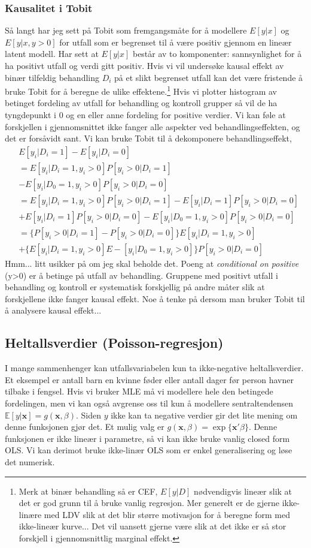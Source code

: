 \subsubsection{Kausalitet i Tobit}
Så langt har jeg sett på Tobit som fremgangsmåte for å modellere $E[y|x]$ og $E[y|x,y>0]$ for utfall som er begrenset til å være positiv gjennom en lineær latent modell. Har sett at $E[y|x]$ består av to komponenter: sannsynlighet for å ha positivt utfall og verdi gitt positiv. Hvis vi vil undersøke kausal effekt av binær tilfeldig behandling $D_i$ på et slikt begrenset utfall kan det være fristende å bruke Tobit for å beregne de ulike effektene.\footnote{Merk at binær behandling så er CEF, $E[y|D]$ nødvendigvis lineær slik at det er god grunn til å bruke vanlig regresjon. Mer generelt er de gjerne ikke-linære med LDV slik at det blir større motivasjon for å beregne form med ikke-lineær kurve... Det vil uansett gjerne være slik at det ikke er så stor forskjell i gjennomsnittlig marginal effekt.} Hvis vi plotter histogram av betinget fordeling av utfall for behandling og kontroll grupper så vil de ha tyngdepunkt i 0 og en eller anne fordeling for positive verdier. Vi kan føle at forskjellen i gjennomsnittet ikke fanger alle aspekter ved behandlingseffekten, og det er forsåvidt sant. Vi kan bruke Tobit til å dekomponere behandlingseffekt,
\begin{align}
&E[y_i|D_i=1] - E[y_i|D_i=0]  \\
&=E[y_i|D_i=1,y_i>0]P[y_i>0|D_i=1] \\
&-E[y_i|D_0=1,y_i>0]P[y_i>0|D_i=0] \\
&= E[y_i|D_i=1,y_i>0]P[y_i>0|D_i=1]-E[y_i|D_i=1]P[y_i>0|D_i=0] \\
&+E[y_i|D_i=1]P[y_i>0|D_i=0]-E[y_i|D_0=1,y_i>0]P[y_i>0|D_i=0] \\
&=\{P[y_i>0|D_i=1]-P[y_i>0|D_i=0]\}E[y_i|D_i=1,y_i>0] \\
&+\{E[y_i|D_i=1,y_i>0]E-[y_i|D_0=1,y_i>0]\}P[y_i>0|D_i=0]
\end{align}
Hmm... litt usikker på om jeg skal beholde det. Poeng at \textit{conditional on positive} (y>0) er å betinge på utfall av behandling. Gruppene med positivt utfall i behandling og kontroll er systematisk forskjellig på andre måter slik at forskjellene ikke fanger kausal effekt. Noe å tenke på dersom man bruker Tobit til å analysere kausal effekt...
\subsection{Heltallsverdier (Poisson-regresjon)}
I mange sammenhenger kan utfallsvariabelen kun ta ikke-negative heltallsverdier. Et eksempel er antall barn en kvinne føder eller antall dager før person havner tilbake i fengsel. Hvis vi bruker MLE må vi modellere hele den betingede fordelingen, men vi kan også avgrense oss til kun å modellere sentraltendensen $\mathbb{E}[y|\mathbf{x}] = g(\mathbf{x},\beta)$. Siden $y$ ikke kan ta negative verdier gir det lite mening om denne funksjonen gjør det. Et mulig valg er $g(\mathbf{x},\beta) = \exp\{\mathbf{x}'\beta\}$. Denne funksjonen er ikke lineær i parametre, så vi kan ikke bruke vanlig closed form OLS. Vi kan derimot bruke ikke-linær OLS som er enkel generalisering og løse det numerisk.


